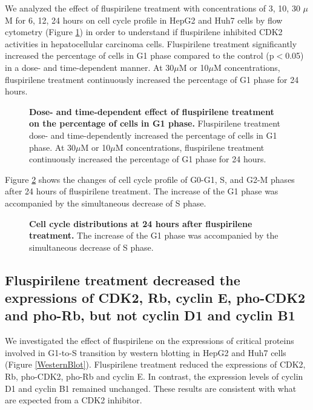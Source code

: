 \documentclass[10pt,letterpaper]{article}
\begin{document}
We analyzed the effect of fluspirilene treatment with concentrations of 3, 10, 30 $\mu$M for 6, 12, 24 hours on cell cycle profile in HepG2 and Huh7 cells by flow cytometry (Figure \ref{G1Distribution}) in order to understand if fluspirilene inhibited CDK2 activities in hepatocellular carcinoma cells. Fluspirilene treatment significantly increased the percentage of cells in G1 phase compared to the control (p$<$0.05) in a dose- and time-dependent manner. At 30$\mu$M or 10$\mu$M concentrations, fluspirilene treatment continuously increased the percentage of G1 phase for 24 hours.

\begin{figure}
\caption{{\bf Dose- and time-dependent effect of fluspirilene treatment on the percentage of cells in G1 phase.} Fluspirilene treatment dose- and time-dependently increased the percentage of cells in G1 phase. At 30$\mu$M or 10$\mu$M concentrations, fluspirilene treatment continuously increased the percentage of G1 phase for 24 hours.}
\label{G1Distribution}
\end{figure}

Figure \ref{CellCycleDistribution} shows the changes of cell cycle profile of G0-G1, S, and G2-M phases after 24 hours of fluspirilene treatment. The increase of the G1 phase was accompanied by the simultaneous decrease of S phase.

\begin{figure}
\caption{{\bf Cell cycle distributions at 24 hours after fluspirilene treatment.} The increase of the G1 phase was accompanied by the simultaneous decrease of S phase.}
\label{CellCycleDistribution}
\end{figure}

\subsection*{Fluspirilene treatment decreased the expressions of CDK2, Rb, cyclin E, pho-CDK2 and pho-Rb, but not cyclin D1 and cyclin B1}

We investigated the effect of fluspirilene on the expressions of critical proteins involved in G1-to-S transition by western blotting in HepG2 and Huh7 cells (Figure \ref{WesternBlot}). Fluspirilene treatment reduced the expressions of CDK2, Rb, pho-CDK2, pho-Rb and cyclin E. In contrast, the expression levels of cyclin D1 and cyclin B1 remained unchanged. These results are consistent with what are expected from a CDK2 inhibitor.
\end{document}
